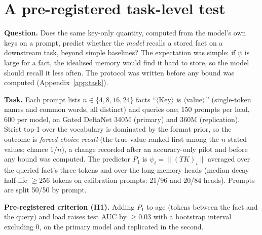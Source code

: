 \documentclass{article}
\begin{document}
\section{A pre-registered task-level test}\label{sec:task}
\textbf{Question.} Does the same key-only quantity, computed from the model's own keys on a prompt, predict whether the \emph{model} recalls a stored fact on a downstream task, beyond simple baselines? The expectation was simple: if $\psi$ is large for a fact, the idealised memory would find it hard to store, so the model should recall it less often. The protocol was written before any bound was computed (Appendix~\ref{app:task}).

\textbf{Task.} Each prompt lists $n\in\{4,8,16,24\}$ facts ``$\langle$Key$\rangle$ is $\langle$value$\rangle$.'' (single-token names and common words, all distinct) and queries one; 150 prompts per load, 600 per model, on Gated DeltaNet 340M (primary) and 360M (replication). Strict top-1 over the vocabulary is dominated by the format prior, so the outcome is \emph{forced-choice recall} (the true value ranked first among the $n$ stated values; chance $1/n$), a change recorded after an accuracy-only pilot and before any bound was computed. The predictor $P_1$ is $\psi_i=\|(TK)_i\|$ averaged over the queried fact's three tokens and over the long-memory heads (median decay half-life $\ge256$ tokens on calibration prompts: 21/96 and 20/84 heads). Prompts are split 50/50 by prompt.

\textbf{Pre-registered criterion (H1).} Adding $P_1$ to age (tokens between the fact and the query) and load raises test AUC by $\ge0.03$ with a bootstrap interval excluding 0, on the primary model and replicated in the second.

\begin{table}[t]
  \caption{Task-level test. Forced-choice accuracy at $n=4/8/16/24$ (chance $.25/.125/.06/.04$), test AUC of the pre-registered baseline B3 (age and one-hot load) with and without $P_1$, and the pre-registered comparison $\Delta$ with its 95\% bootstrap interval.}\label{tab:task}
  \centering\small\setlength{\tabcolsep}{4pt}
  
\end{table}
\end{document}
